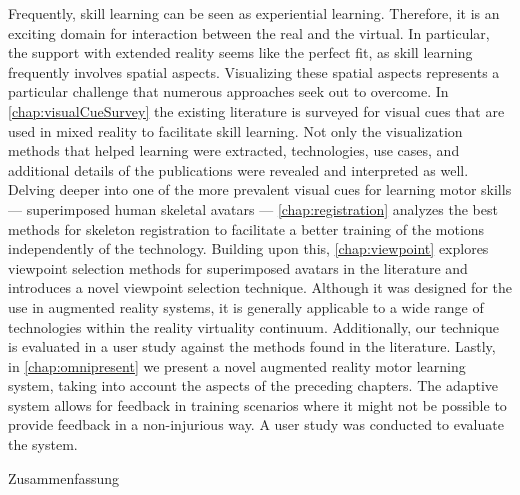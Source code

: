 Frequently, skill learning can be seen as experiential learning. Therefore, it is an exciting domain for interaction between the real and the virtual. In particular, the support with extended reality seems like the perfect fit, as skill learning frequently involves spatial aspects. Visualizing these spatial aspects represents a particular challenge that numerous approaches seek out to overcome. In \autoref{chap:visualCueSurvey} the existing literature is surveyed for visual cues that are used in mixed reality to facilitate skill learning. Not only the visualization methods that helped learning were extracted, technologies, use cases, and additional details of the publications were revealed and interpreted as well.
Delving deeper into one of the more prevalent visual cues for learning motor skills --- superimposed human skeletal avatars --- \autoref{chap:registration} analyzes the best methods for skeleton registration to facilitate a better training of the motions independently of the technology.
Building upon this, \autoref{chap:viewpoint} explores viewpoint selection methods for superimposed avatars in the literature and introduces a novel viewpoint selection technique. Although it was designed for the use in augmented reality systems, it is generally applicable to a wide range of technologies within the reality virtuality continuum. Additionally, our technique is evaluated in a user study against the methods found in the literature.
Lastly, in \autoref{chap:omnipresent} we present a novel augmented reality motor learning system, taking into account the aspects of the preceding chapters. The adaptive system allows for feedback in training scenarios where it might not be possible to provide feedback in a non-injurious way. A user study was conducted to evaluate the system.


\vspace*{20mm}

{Zusammenfassung}\label{sec:abstract-diff} \\

\blindtext
